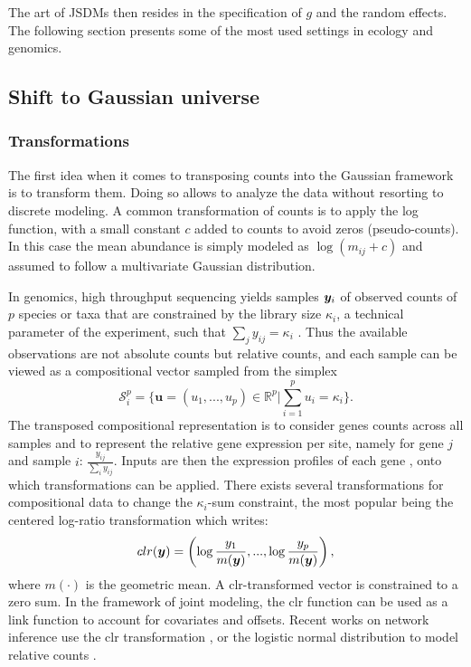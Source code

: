 The art of JSDMs then resides in the specification of $g$ and the random effects. The following section presents some of the most used settings in ecology and genomics.

\subsection{Shift to Gaussian universe} 
\subsubsection{Transformations}
The first idea when it comes to transposing counts into the Gaussian framework is to transform them. Doing so allows to analyze the data without resorting to discrete modeling. A common transformation of counts is to apply the log function, with a  small constant $c$ added to counts to avoid zeros (pseudo-counts). In this case the mean abundance is simply modeled as $\log(m_{ij}+c)$ and assumed to follow a multivariate Gaussian distribution. 

In genomics, high throughput sequencing yields  samples ${\boldsymbol{y}}_i$  of observed counts of $p$ species or taxa that are constrained by the library size $\kappa_i$, a technical parameter of the experiment, such that $\sum_j y_{ij}=\kappa_i$ \citep{GMP17}. Thus the available observations are not absolute counts but relative counts, and each sample can be viewed as a compositional vector \citep{A82} sampled from the simplex
$$\mathcal{S}_i^p = \bigg\{ \boldsymbol{u}=(u_1,...,u_p)\in \mathds{R}^p\bigg\rvert\sum_{i=1}^p u_i = \kappa_i\bigg\}.$$
The transposed compositional representation is to consider  genes counts across all samples and to represent the relative gene expression per site, namely for gene $j$ and sample $i$: $\frac{y_{ij}}{\sum_i y_{ij}}$. Inputs are then the expression profiles of each gene \citep{RMR18}, onto which transformations  can be applied. 
There exists several transformations for compositional data to change the $\kappa_i$-sum constraint, the most popular being the centered log-ratio transformation  which writes:
$$clr({\boldsymbol{y}})=\left(\log \frac{y_1}{m({\boldsymbol{y}})}, ..., \log \frac{y_p}{m({\boldsymbol{y}})}\right), $$
where $m(\cdot)$ is the geometric mean. A clr-transformed vector is constrained to a zero sum. In the framework of joint modeling, the clr function can be used as a link function to account for covariates and offsets. Recent works on network inference use the clr transformation  \citep{kurtz}, or the logistic normal distribution \citep{AS80} to model relative counts \citep{gcoda}.


